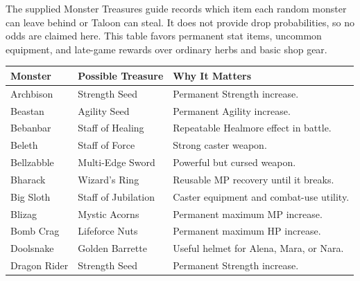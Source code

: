 \documentclass[
  american,
  10pt,
  letterpaper,
  oneside,
  open=any]{scrreprt}
\newcounter{none} %
\newenvironment{guidetable}{%
  \small\setstretch{1.0}%
  \setlength{\tabcolsep}{4pt}%
  \setlength{\LTpre}{8pt}\setlength{\LTpost}{10pt}%
  \renewcommand{\arraystretch}{1.16}%
}{ }
\begin{document}
The supplied Monster Treasures guide records which item each random
monster can leave behind or Taloon can steal. It does not provide drop
probabilities, so no odds are claimed here. This table favors permanent
stat items, uncommon equipment, and late-game rewards over ordinary
herbs and basic shop gear.

\begin{guidetable}

{\def\LTcaptype{none} %
\begin{longtable}[]{@{}
  >{\raggedright\arraybackslash}p{}
  >{\raggedright\arraybackslash}p{}
  >{\raggedright\arraybackslash}p{}@{}}
\toprule\noalign{}
\begin{minipage}[b]{\linewidth}\raggedright
\color{GuideGreen}\bfseries Monster
\end{minipage} & \begin{minipage}[b]{\linewidth}\raggedright
\color{GuideGreen}\bfseries Possible Treasure
\end{minipage} & \begin{minipage}[b]{\linewidth}\raggedright
\color{GuideGreen}\bfseries Why It Matters
\end{minipage} \\
\midrule\noalign{}
\endhead
\bottomrule\noalign{}
\endlastfoot
Archbison & Strength Seed & Permanent Strength increase. \\
Beastan & Agility Seed & Permanent Agility increase. \\
Bebanbar & Staff of Healing & Repeatable Healmore effect in battle. \\
Beleth & Staff of Force & Strong caster weapon. \\
Bellzabble & Multi-Edge Sword & Powerful but cursed weapon. \\
Bharack & Wizard's Ring & Reusable MP recovery until it breaks. \\
Big Sloth & Staff of Jubilation & Caster equipment and combat-use
utility. \\
Blizag & Mystic Acorns & Permanent maximum MP increase. \\
Bomb Crag & Lifeforce Nuts & Permanent maximum HP increase. \\
Doolsnake & Golden Barrette & Useful helmet for Alena, Mara, or Nara. \\
Dragon Rider & Strength Seed & Permanent Strength increase. \\

\end{longtable}}
\end{guidetable}
\end{document}
